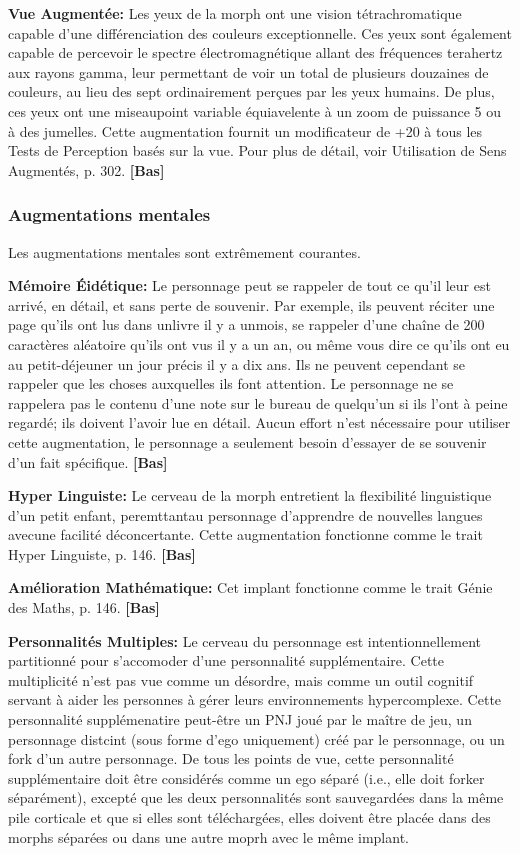 {{\textbf{Vue Augmentée:} Les yeux de la morph ont une vision tétrachromatique capable d'une différenciation des couleurs exceptionnelle. Ces yeux sont également capable de percevoir le spectre électromagnétique allant des fréquences terahertz aux rayons gamma, leur permettant de voir un total de plusieurs douzaines de couleurs, au lieu des sept ordinairement perçues par les yeux humains. De plus, ces yeux ont une miseaupoint variable équiavelente à un zoom de puissance 5 ou à des jumelles. Cette augmentation fournit un modificateur de +20 à tous les Tests de Perception basés sur la vue. Pour plus de détail, voir Utilisation de Sens Augmentés, p. 302. \textbf{[Bas]} 

\subsubsection{Augmentations mentales} 

Les augmentations mentales sont extrêmement courantes. 

\textbf{Mémoire Éidétique:} Le personnage peut se rappeler de tout ce qu'il leur est arrivé, en détail, et sans perte de souvenir. Par exemple, ils peuvent réciter une page qu'ils ont lus dans unlivre il y a unmois, se rappeler d'une chaîne de 200 caractères aléatoire qu'ils ont vus il y a un an, ou même vous dire ce qu'ils ont eu au petit-déjeuner un jour précis il y a dix ans. Ils ne peuvent cependant se rappeler que les choses auxquelles ils font attention. Le personnage ne se rappelera pas le contenu d'une note sur le bureau de quelqu'un si ils l'ont à peine regardé; ils doivent l'avoir lue en détail. Aucun effort n'est nécessaire pour utiliser cette augmentation, le personnage a seulement besoin d'essayer de se souvenir d'un fait spécifique. \textbf{[Bas]} 

\textbf{Hyper Linguiste:} Le cerveau de la morph entretient la flexibilité linguistique d'un petit enfant, peremttantau personnage d'apprendre de nouvelles langues avecune facilité déconcertante. Cette augmentation fonctionne comme le trait Hyper Linguiste, p. 146. \textbf{[Bas]} 

\textbf{Amélioration Mathématique:} Cet implant fonctionne comme le trait Génie des Maths, p. 146. \textbf{[Bas]} 

\textbf{Personnalités Multiples:} Le cerveau du personnage est intentionnellement partitionné pour s'accomoder d'une personnalité supplémentaire. Cette multiplicité n'est pas vue comme un désordre, mais comme un outil cognitif servant à aider les personnes à gérer leurs environnements hypercomplexe. Cette personnalité supplémenatire peut-être un PNJ joué par le maître de jeu, un personnage distcint (sous forme d'ego uniquement) créé par le personnage, ou un fork d'un autre personnage. De tous les points de vue, cette personnalité supplémentaire doit être considérés comme un ego séparé (i.e., elle doit forker séparément), excepté que les deux personnalités sont sauvegardées dans la même pile corticale et que si elles sont téléchargées, elles doivent être placée dans des morphs séparées ou dans une autre moprh avec le même implant. 

}}
